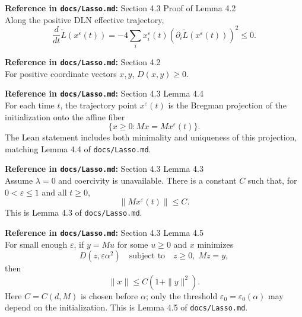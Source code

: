 \begin{lemma}\label{lem:tiltedLossDecrease}
  \textbf{Reference in \texttt{docs/Lasso.md}:} Section 4.3 Proof of Lemma 4.2\\
Along the positive DLN effective trajectory,
\[
  \frac{d}{dt}\widetilde L(x^\varepsilon(t))
    = -4\sum_i x_i^\varepsilon(t)
        (\partial_i\widetilde L(x^\varepsilon(t)))^2 \le 0.
\]
\end{lemma}

\begin{lemma}\label{lem:entropyBregmanNonneg}
  \textbf{Reference in \texttt{docs/Lasso.md}:} Section 4.2\\
For positive coordinate vectors $x,y$, $D(x,y)\ge 0$.
\end{lemma}

\begin{lemma}\label{lem:bregmanProjection}
  \textbf{Reference in \texttt{docs/Lasso.md}:} Section 4.3 Lemma 4.4\\
For each time $t$, the trajectory point $x^\varepsilon(t)$ is the Bregman
projection of the initialization onto the affine fiber
\[
  \{x\ge 0: Mx=Mx^\varepsilon(t)\}.
\]
The Lean statement includes both minimality and uniqueness of this projection,
matching Lemma 4.4 of \texttt{docs/Lasso.md}.
\end{lemma}

\begin{lemma}\label{lem:posMatVecBound}
  \textbf{Reference in \texttt{docs/Lasso.md}:} Section 4.3 Lemma 4.3\\
Assume $\lambda=0$ and coercivity is unavailable.
There is a constant $C$ such that, for $0<\varepsilon\le 1$ and all $t\ge0$,
\[
  \|M x^\varepsilon(t)\|\le C.
\]
This is Lemma 4.3 of \texttt{docs/Lasso.md}.
\end{lemma}

\begin{lemma}\label{lem:bregmanFiberBound}
  \textbf{Reference in \texttt{docs/Lasso.md}:} Section 4.3 Lemma 4.5\\
For small enough $\varepsilon$, if $y=Mu$ for some $u\ge0$ and $x$ minimizes
\[
  D(z,\varepsilon\alpha^2)
  \quad\text{subject to}\quad z\ge0,\; Mz=y,
\]
then
\[
  \|x\|\le C(1+\|y\|^2).
\]
Here $C=C(d,M)$ is chosen before $\alpha$; only the threshold
$\varepsilon_0=\varepsilon_0(\alpha)$ may depend on the initialization.
This is Lemma 4.5 of \texttt{docs/Lasso.md}.
\end{lemma}

